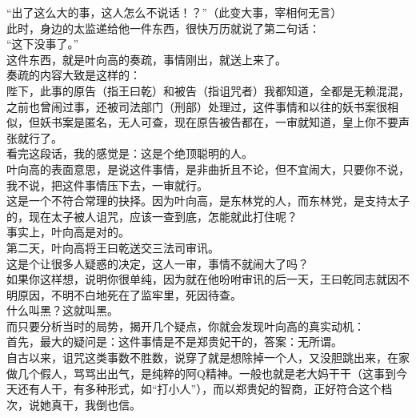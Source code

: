 \begin{multicols}{\theparacolNo}
“出了这么大的事，这人怎么不说话！？”（此变大事，宰相何无言）\\

此时，身边的太监递给他一件东西，很快万历就说了第二句话：\\

“这下没事了。”\\

这件东西，就是叶向高的奏疏，事情刚出，就送上来了。\\

奏疏的内容大致是这样的：\\

陛下，此事的原告（指王曰乾）和被告（指诅咒者）我都知道，全都是无赖混混，之前也曾闹过事，还被司法部门（刑部）处理过，这件事情和以往的妖书案很相似，但妖书案是匿名，无人可查，现在原告被告都在，一审就知道，皇上你不要声张就行了。\\

看完这段话，我的感觉是：这是个绝顶聪明的人。\\

叶向高的表面意思，是说这件事情，是非曲折且不论，但不宜闹大，只要你不说，我不说，把这件事情压下去，一审就行。\\

这是一个不符合常理的抉择。因为叶向高，是东林党的人，而东林党，是支持太子的，现在太子被人诅咒，应该一查到底，怎能就此打住呢？\\

事实上，叶向高是对的。\\

第二天，叶向高将王曰乾送交三法司审讯。\\

这是个让很多人疑惑的决定，这人一审，事情不就闹大了吗？\\

如果你这样想，说明你很单纯，因为就在他吩咐审讯的后一天，王曰乾同志就因不明原因，不明不白地死在了监牢里，死因待查。\\

什么叫黑？这就叫黑。\\

而只要分析当时的局势，揭开几个疑点，你就会发现叶向高的真实动机：\\

首先，最大的疑问是：这件事情是不是郑贵妃干的，答案：无所谓。\\

自古以来，诅咒这类事数不胜数，说穿了就是想除掉一个人，又没胆跳出来，在家做几个假人，骂骂出出气，是纯粹的阿Q精神。一般也就是老大妈干干（这事到今天还有人干，有多种形式，如“打小人”），而以郑贵妃的智商，正好符合这个档次，说她真干，我倒也信。\\


\end{multicols}
